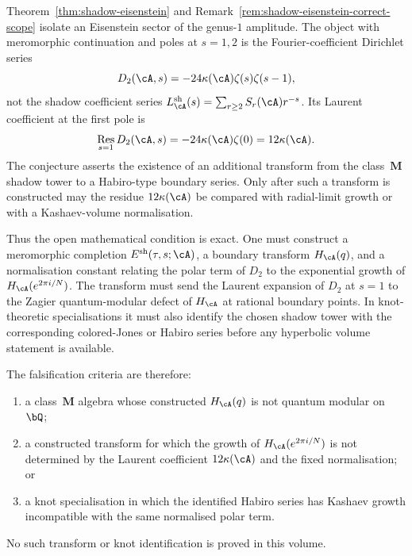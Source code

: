 \begin{remark}
\label{rem:shadow-s1-quantum-volume-criterion}
Theorem~\ref{thm:shadow-eisenstein} and
Remark~\ref{rem:shadow-eisenstein-correct-scope} isolate an
Eisenstein sector of the genus-$1$ amplitude. The object with
meromorphic continuation and poles at $s=1,2$ is the
Fourier-coefficient Dirichlet series
\[
 D_2(\cA,s)=-24\kappa(\cA)\zeta(s)\zeta(s-1),
\]
not the shadow coefficient series
$L_\cA^{\mathrm{sh}}(s)=\sum_{r\ge2}S_r(\cA)r^{-s}$. Its Laurent
coefficient at the first pole is
\[
 \operatorname*{Res}_{s=1}D_2(\cA,s)
 =-24\kappa(\cA)\zeta(0)
 =12\kappa(\cA).
\]
The conjecture asserts the existence of an additional transform from
the class~$\mathbf M$ shadow tower to a Habiro-type boundary series.
Only after such a transform is constructed may the residue
$12\kappa(\cA)$ be compared with radial-limit growth or with a
Kashaev-volume normalisation.

Thus the open mathematical condition is exact. One must construct a
meromorphic completion $E^{\mathrm{sh}}(\tau,s;\cA)$, a boundary
transform $H_\cA(q)$, and a normalisation constant relating the
polar term of $D_2$ to the exponential growth of
$H_\cA(e^{2\pi i/N})$. The transform must send the Laurent
expansion of $D_2$ at $s=1$ to the Zagier quantum-modular defect of
$H_\cA$ at rational boundary points. In knot-theoretic
specialisations it must also identify the chosen shadow tower with
the corresponding colored-Jones or Habiro series before any
hyperbolic volume statement is available.

The falsification criteria are therefore:
\begin{enumerate}[label=\textup{(\roman*)}]
\item a class~$\mathbf M$ algebra whose constructed
 $H_\cA(q)$ is not quantum modular on~$\bQ$;
\item a constructed transform for which the growth of
 $H_\cA(e^{2\pi i/N})$ is not determined by the Laurent
 coefficient $12\kappa(\cA)$ and the fixed normalisation; or
\item a knot specialisation in which the identified Habiro series has
 Kashaev growth incompatible with the same normalised polar term.
\end{enumerate}
No such transform or knot identification is proved in this volume.
\end{remark}

